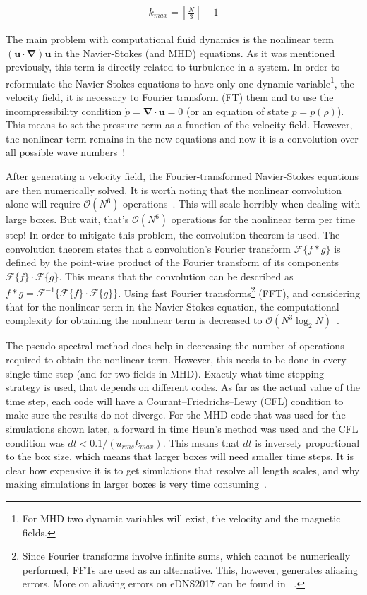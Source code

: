 \documentclass[12pt,a4paper]{report}
\begin{document}
\begin{align}
 k_{max} = \left\lfloor \frac{N}{3} \right\rfloor - 1
 \label{eq4.1}
\end{align}


The main problem with computational fluid dynamics is the nonlinear term $(\bm u \cdot \bm \nabla) \bm u$ in the Navier-Stokes (and MHD) equations. As it was mentioned previously, this term is directly related to turbulence in a system. In order to reformulate the Navier-Stokes equations to have only one dynamic variable\footnote{For MHD two dynamic variables will exist, the velocity and the magnetic fields.}, the velocity field, it is necessary to Fourier transform (FT) them and to use the incompressibility condition $\dot{p}=\bm \nabla \cdot \bm u = 0$ (or an equation of state $p=p(\rho)$). This means to set the pressure term as a function of the velocity field. However, the nonlinear term remains in the new equations and now it is a convolution over all possible wave numbers~\cite{mccomb1990physics}!
 
After generating a velocity field, the Fourier-transformed Navier-Stokes equations are then numerically solved. It is worth noting that the nonlinear convolution alone will require $\mathcal{O}(N^6)$ operations~\cite{mccomb1990physics}. This will scale horribly when dealing with large boxes. But wait, that's $\mathcal{O}(N^6)$ operations for the nonlinear term per time step! In order to mitigate this problem, the convolution theorem is used. The convolution theorem states that a convolution's Fourier transform $\mathcal{F}\{f \ast g\}$ is defined by the point-wise product of the Fourier transform of its components $\mathcal{F}\{f\} \cdot \mathcal{F}\{g\}$. This means that the convolution can be described as $f \ast g = \mathcal{F}^{-1}\{ \mathcal{F}\{f\} \cdot \mathcal{F}\{g\} \}$. Using fast Fourier transforms\footnote{Since Fourier transforms involve infinite sums, which cannot be numerically performed, FFTs are used as an alternative. This, however, generates aliasing errors. More on aliasing errors on eDNS2017 can be found in ~\cite{yoffe2013investigation}.} (FFT), and considering that for the nonlinear term in the Navier-Stokes equation, the computational complexity for obtaining the nonlinear term is decreased to $\mathcal{O}(N^3 \log_2 N)$~\cite{mccomb1990physics}.

The pseudo-spectral method does help in decreasing the number of operations required to obtain the nonlinear term. However, this needs to be done in every single time step (and for two fields in MHD). Exactly what time stepping strategy is used, that depends on different codes. As far as the actual value of the time step, each code will have a Courant–Friedrichs–Lewy (CFL) condition to make sure the results do not diverge. For the MHD code that was used for the simulations shown later, a forward in time Heun's method was used and the CFL condition was $dt < 0.1/(u_{rms}k_{max})$. This means that $dt$ is inversely proportional to the box size, which means that larger boxes will need smaller time steps. It is clear how expensive it is to get simulations that resolve all length scales, and why making simulations in larger boxes is very time consuming~\cite{yoffe2013investigation, LinkmannMoritzFrederikLeon2016Spim}. 
\end{document}
